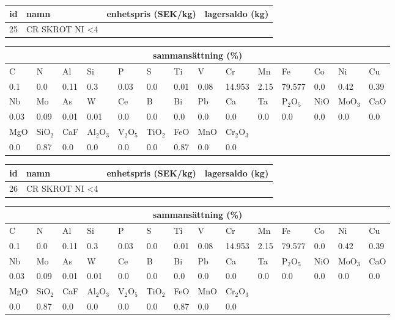 \begin{center}
{\scriptsize\addtolength{\tabcolsep}{-3pt}
\begin{tabular}{clcc}
id&namn&enhetspris (SEK/kg)&lagersaldo (kg)\\
\hline
25&CR SKROT NI <4%
\end{tabular}
\begin{tabular}{llllllllllllll}
\multicolumn{14}{c}{sammansättning (\%)}\\
\hline
C&N&Al&Si&P&S&Ti&V&Cr&Mn&Fe&Co&Ni&Cu\\
\hline
0.1&0.0&0.11&0.3& 0.03&0.0&0.01&0.08& 14.953&2.15&79.577&0.0& 0.42&0.39\\
\hline
Nb&Mo&As&W&Ce&B&Bi&Pb&Ca&Ta&P$_2$O$_5$&NiO&MoO$_3$&CaO\\
\hline
0.03& 0.09& 0.01& 0.01& 0.0& 0.0& 0.0& 0.0& 0.0& 0.0& 0.0& 0.0& 0.0& 0.0\\
\hline
MgO&SiO$_2$&CaF&Al$_2$O$_3$&V$_2$O$_5$&TiO$_2$&FeO&MnO&Cr$_2$O$_3$\\
\hline
0.0& 0.87& 0.0& 0.0& 0.0& 0.0& 0.87& 0.0& 0.0\\
\end{tabular}
}
\end{center}

\begin{center}
{\scriptsize\addtolength{\tabcolsep}{-3pt}
\begin{tabular}{clcc}
id&namn&enhetspris (SEK/kg)&lagersaldo (kg)\\
\hline
26&CR SKROT NI <4%
\end{tabular}
\begin{tabular}{llllllllllllll}
\multicolumn{14}{c}{sammansättning (\%)}\\
\hline
C&N&Al&Si&P&S&Ti&V&Cr&Mn&Fe&Co&Ni&Cu\\
\hline
0.1&0.0&0.11&0.3& 0.03&0.0&0.01&0.08& 14.953&2.15&79.577&0.0& 0.42&0.39\\
\hline
Nb&Mo&As&W&Ce&B&Bi&Pb&Ca&Ta&P$_2$O$_5$&NiO&MoO$_3$&CaO\\
\hline
0.03& 0.09& 0.01& 0.01& 0.0& 0.0& 0.0& 0.0& 0.0& 0.0& 0.0& 0.0& 0.0& 0.0\\
\hline
MgO&SiO$_2$&CaF&Al$_2$O$_3$&V$_2$O$_5$&TiO$_2$&FeO&MnO&Cr$_2$O$_3$\\
\hline
0.0& 0.87& 0.0& 0.0& 0.0& 0.0& 0.87& 0.0& 0.0\\
\end{tabular}
}
\end{center}

